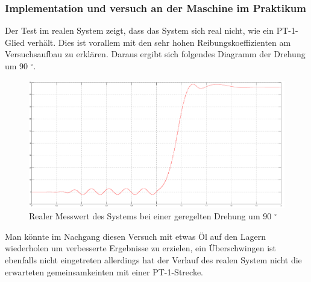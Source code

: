 \documentclass[10pt]{scrartcl}
\begin{document}
\subsubsection{Implementation und versuch an der Maschine im Praktikum}
Der Test im realen System zeigt, dass das System sich real nicht, wie ein PT-1-Glied verhält. Dies ist vorallem mit den sehr hohen Reibungskoeffizienten am Versuchsaufbau zu erklären. Daraus ergibt sich folgendes Diagramm der Drehung um 90 $^\circ$.
\begin{figure}[H]
	\centering
	\includegraphics[width=1.2\textwidth]{Drehzahl57B.png}
	\caption{Realer Messwert des Systems bei einer geregelten Drehung um 90 $^\circ$}
	\label{img:grafik-dummy}
\end{figure}
Man könnte im Nachgang diesen Versuch mit etwas Öl auf den Lagern wiederholen um verbesserte Ergebnisse zu erzielen, ein Überschwingen ist ebenfalls nicht eingetreten allerdings hat der Verlauf des realen System nicht die erwarteten gemeinsamkeinten mit einer PT-1-Strecke.
\newpage



\newpage
\end{document}
